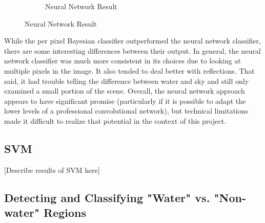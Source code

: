 \documentclass[12pt]{article}
\begin{document}
\begin{figure}
\begin{subfigure}{.33\textwidth}
  \caption{Neural Network Result}
\end{subfigure}%

\end{figure}

	While the per pixel Bayesian classifier outperformed the neural network classifier, there are some interesting differences between their output.  In general, the neural network classifier was much more consistent in its choices due to looking at multiple pixels in the image.  It also tended to deal better with reflections.  That said, it had trouble telling the difference between water and sky and still only examined a small portion of the scene.  Overall, the neural network approach appears to have significant promise (particularly if it is possible to adapt the lower levels of a professional convolutional network), but technical limitations made it difficult to realize that potential in the context of this project.

	\subsection{SVM}
	[Describe results of SVM here]
	
	\subsection{Detecting and Classifying "Water" vs. "Non-water" Regions}
\end{document}
